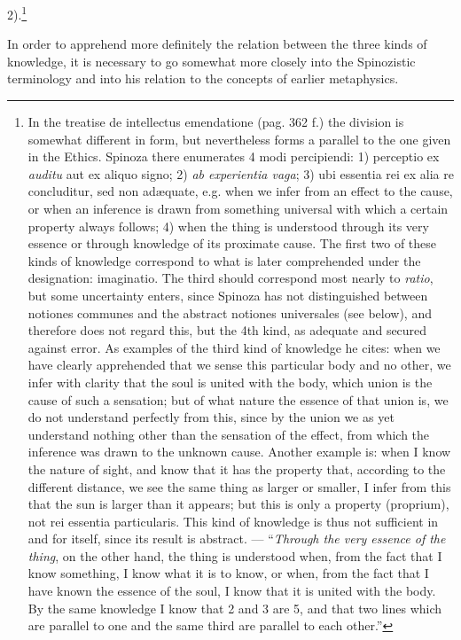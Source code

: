 \documentclass[12pt,a4paper,openany]{book}
\newcommand{\opage}[1]{\marginnote{\footnotesize\textit{[#1]}}}
\begin{document}
2).\footnote{In the treatise de intellectus emendatione (pag. 362 f.)
the division is somewhat different in form, but nevertheless forms a
parallel to the one given in the Ethics. Spinoza there enumerates 4 modi
percipiendi: 1) perceptio ex \emph{auditu} aut ex aliquo signo; 2)
\emph{ab experientia vaga}; 3) ubi essentia rei ex alia re
concluditur, sed non adæquate, e.g. when we infer from an effect
to the cause, or when an inference is drawn from something universal with
which a certain property always follows; 4) when the thing is understood through
its very essence or through knowledge of its proximate cause. The first two
of these kinds of knowledge correspond to what is later
comprehended under the designation: imaginatio. The third should
correspond most nearly to \emph{ratio}, but some uncertainty enters,
since Spinoza has not distinguished between notiones communes and the
abstract notiones universales (see below), and therefore does not
regard this, but the 4th kind, as adequate and secured against
error. As examples of the third kind of knowledge he cites:
when we have clearly apprehended that we sense this particular body and
no other, we infer with clarity that the soul is united with
the body, which union is the cause of such a sensation; but of
what nature the essence of that union is, we do not understand perfectly
from this, since by the union we as yet understand nothing other than
the sensation of the effect, from which the inference was drawn to the
unknown cause. Another example is: when I know the nature of sight,
and know that it has the property that, according to the different
distance, we see the same thing as larger or smaller, I infer
from this that the sun is larger than it appears; but this is only a
property (proprium), not rei essentia particularis. This
kind of knowledge is thus not sufficient in and for itself, since its
result is abstract. --- ``\emph{Through the very essence of the thing}, on the other hand,
the thing is understood when, from the fact that I know something, I know what it is
to know, or when, from the fact that I have known the essence of the soul,
I know that it is united with the body. By the same knowledge I know
that 2 and 3 are 5, and that two lines which are parallel to one and
the same third are parallel to each other.''}

\opage{96}\setcounter{footnote}{0}In order to apprehend more definitely the relation between the three kinds of knowledge,
it is necessary to go somewhat more closely into the Spinozistic
terminology and into his relation to the concepts of earlier
metaphysics.
\end{document}
